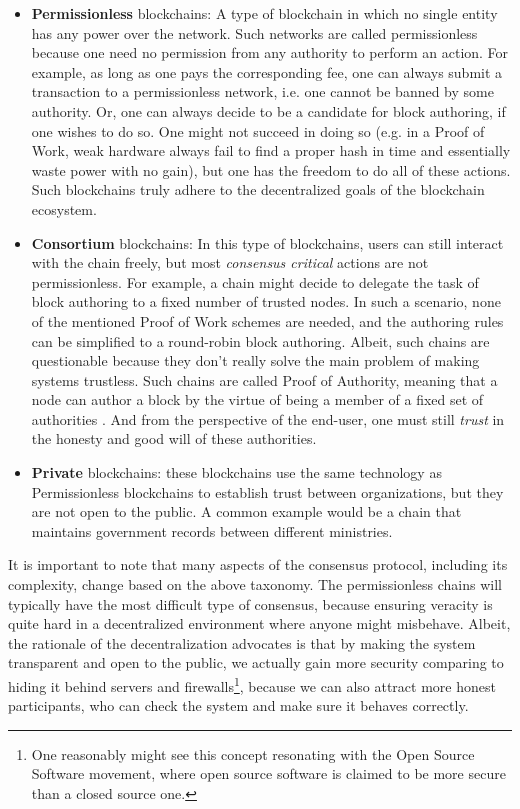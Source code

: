 \begin{itemize}
	\item \textbf{Permissionless} blockchains: A type of blockchain in which no single entity has
	any power over the network. Such networks are called permissionless because one need no
	permission from any authority to perform an action. For example, as long as one pays the
	corresponding fee, one can always submit a transaction to a permissionless network, i.e. one
	cannot be banned by some authority. Or, one can always decide to be a candidate for block
	authoring, if one wishes to do so. One might not succeed in doing so (e.g. in a Proof of Work,
	weak hardware always fail to find a proper hash in time and essentially waste power with no
	gain), but one has the freedom to do all of these actions. Such blockchains truly adhere to the
	decentralized goals of the blockchain ecosystem.
	\item \textbf{Consortium} blockchains: In this type of blockchains, users can still interact
	with the chain freely, but most \textit{consensus critical} actions are not permissionless. For
	example, a chain might decide to delegate the task of block authoring to a fixed number of
	trusted nodes. In such a scenario, none of the mentioned Proof of Work schemes are needed, and
	the authoring rules can be simplified to a round-robin block authoring. Albeit, such chains are
	questionable because they don't really solve the main problem of making systems trustless. Such
	chains are called Proof of Authority, meaning that a node can author a block by the virtue of
	being a member of a fixed set of authorities \cite{deangelisPBFTVsProofofauthority2018}. And
	from the perspective of the end-user, one must still \textit{trust} in the honesty and good will
	of these authorities.
	\item \textbf{Private} blockchains: these blockchains use the same technology as Permissionless
	blockchains to establish trust between organizations, but they are not open to the public. A
	common example would be a chain that maintains government records between different ministries.
\end{itemize}

It is important to note that many aspects of the consensus protocol, including its complexity,
change based on the above taxonomy. The permissionless chains will typically have the most difficult
type of consensus, because ensuring veracity is quite hard in a decentralized environment where
anyone might misbehave. Albeit, the rationale of the decentralization advocates is that by making
the system transparent and open to the public, we actually gain more security comparing to hiding it
behind servers and firewalls\footnote{One reasonably might see this concept resonating with the Open
Source Software movement, where open source software is claimed to be more secure than a closed
source one.}, because we can also attract more honest participants, who can check the system and
make sure it behaves correctly.

